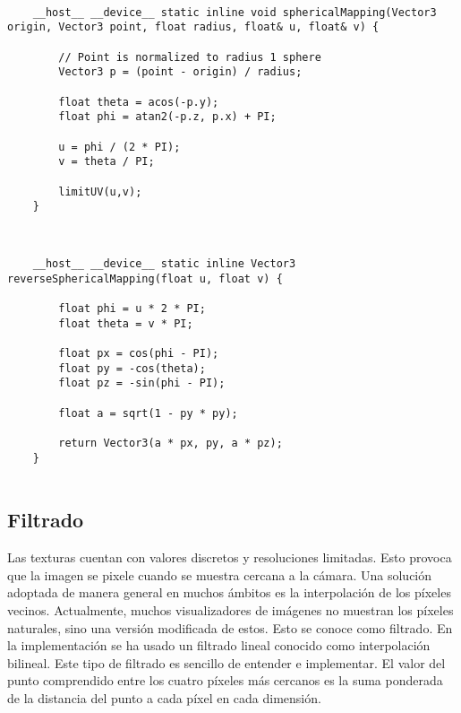 \label{sphericalmapping}

\begin{minipage}[c]{0.95\textwidth}
\begin{lstlisting}[label={cod:sphericalmapping}, caption={Código para calcular las coordenadas u,v a través de un vector en una esfera de radio determinado.}]
	
    __host__ __device__ static inline void sphericalMapping(Vector3 origin, Vector3 point, float radius, float& u, float& v) {

        // Point is normalized to radius 1 sphere
        Vector3 p = (point - origin) / radius;

        float theta = acos(-p.y);
        float phi = atan2(-p.z, p.x) + PI;

        u = phi / (2 * PI);
        v = theta / PI;

        limitUV(u,v);
    }
	
\end{lstlisting}
\end{minipage}

\begin{minipage}[c]{0.95\textwidth}
\begin{lstlisting}[label={cod:reversesphericalmapping}, caption={Función inversa al mapeo esférico.}]
		
	__host__ __device__ static inline Vector3 reverseSphericalMapping(float u, float v) {

        float phi = u * 2 * PI;
        float theta = v * PI;

        float px = cos(phi - PI);
        float py = -cos(theta);
        float pz = -sin(phi - PI);

        float a = sqrt(1 - py * py);

        return Vector3(a * px, py, a * pz);
    }
	
\end{lstlisting}
\end{minipage}


\subsection{Filtrado}
			
Las texturas cuentan con valores discretos y resoluciones limitadas. Esto provoca que la imagen se pixele cuando se muestra cercana a la cámara. Una solución adoptada de manera general en muchos ámbitos es la interpolación de los píxeles vecinos. Actualmente, muchos visualizadores de imágenes no muestran los píxeles naturales, sino una versión modificada de estos. Esto se conoce como filtrado. En la implementación se ha usado un filtrado lineal conocido como interpolación bilineal. Este tipo de filtrado es sencillo de entender e implementar. El valor del punto  comprendido entre los cuatro píxeles más cercanos  es la suma ponderada de la distancia del punto a cada píxel en cada dimensión.
	
